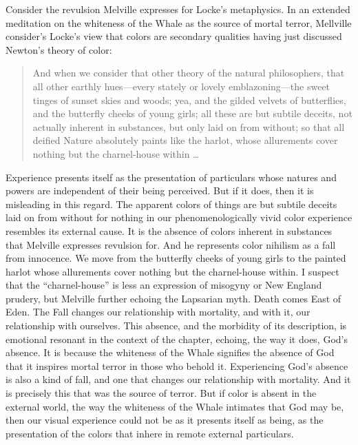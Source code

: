 Consider the revulsion Melville expresses for Locke's \citeyearpar{Locke:1706hc} metaphysics. In an extended meditation on the whiteness of the Whale as the source of mortal terror, Mellville consider's Locke's view that colors are secondary qualities having just discussed Newton's theory of color:
\begin{quote}
	And when we consider that other theory of the natural philosophers, that all other earthly hues---every stately or lovely emblazoning---the sweet tinges of sunset skies and woods; yea, and the gilded velvets of butterflies, and the butterfly cheeks of young girls; all these are but subtile deceits, not actually inherent in substances, but only laid on from without; so that all deified Nature absolutely paints like the harlot, whose allurements cover nothing but the charnel-house within \ldots\ \citep[ch. 42]{Melville:1851ms}
\end{quote}
Experience presents itself as the presentation of particulars whose natures and powers are independent of their being perceived. But if it does, then it is misleading in this regard. The apparent colors of things are but subtile deceits laid on from without for nothing in our phenomenologically vivid color experience resembles its external cause. It is the absence of colors inherent in substances that Melville expresses revulsion for. And he represents color nihilism as a fall from innocence. We move from the butterfly cheeks of young girls to the painted harlot whose allurements cover nothing but the charnel-house within. I suspect that the ``charnel-house'' is less an expression of misogyny or New England prudery, but Melville further echoing the Lapsarian myth. Death comes East of Eden. The Fall changes our relationship with mortality, and with it, our relationship with ourselves. This absence, and the morbidity of its description, is emotional resonant in the context of the chapter, echoing, the way it does, God's absence. It is because the whiteness of the Whale signifies the absence of God that it inspires mortal terror in those who behold it. Experiencing God's absence is also a kind of fall, and one that changes our relationship with mortality. And it is precisely this that was the source of terror. But if color is absent in the external world, the way the whiteness of the Whale intimates that God may be, then our visual experience could not be as it presents itself as being, as the presentation of the colors that inhere in remote external particulars.


